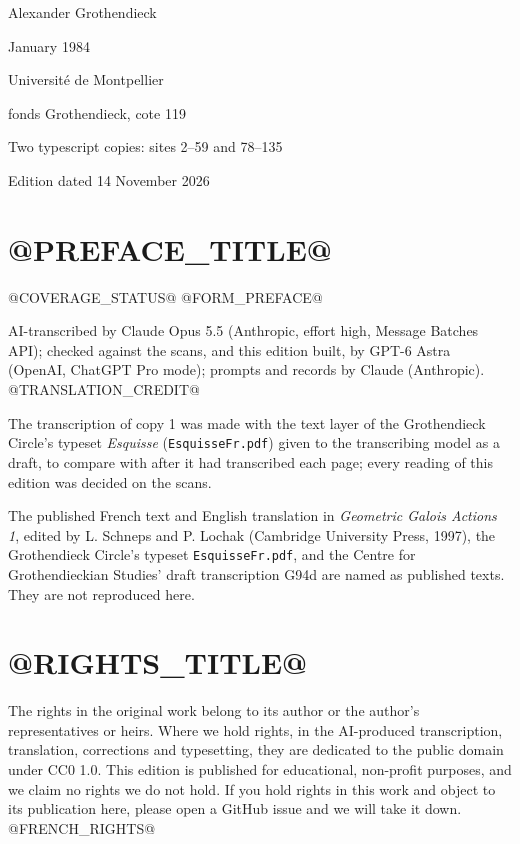 \hypersetup{pageanchor=false}
\begin{titlepage}
\centering
\vspace*{18mm}
{\Large Alexander Grothendieck\par}
\vspace{12mm}
{\Huge\bfseries\EditionTitle\par}
\vspace{8mm}
{\Large\EditionForm\par}
\vspace{14mm}
{\large January 1984\par}
\vfill
{\large Université de Montpellier\par fonds Grothendieck, cote 119\par}
\vspace{8mm}
{\normalsize Two typescript copies: sites 2--59 and 78--135\par}
\vspace{8mm}
{\normalsize Edition dated 14 November 2026\par}
\end{titlepage}
\hypersetup{pageanchor=true}
\thispagestyle{plain}
\section*{@PREFACE_TITLE@}
@COVERAGE_STATUS@
@FORM_PREFACE@

\smallskip
AI-transcribed by Claude Opus 5.5 (Anthropic, effort high, Message Batches API); checked against the scans, and this edition built, by GPT-6 Astra (OpenAI, ChatGPT Pro mode); prompts and records by Claude (Anthropic).
@TRANSLATION_CREDIT@

The transcription of copy 1 was made with the text layer of the Grothendieck Circle's typeset \textit{Esquisse} (\texttt{EsquisseFr.pdf}) given to the transcribing model as a draft, to compare with after it had transcribed each page; every reading of this edition was decided on the scans.

The published French text and English translation in \textit{Geometric Galois Actions 1}, edited by L. Schneps and P. Lochak (Cambridge University Press, 1997), the Grothendieck Circle's typeset \texttt{EsquisseFr.pdf}, and the Centre for Grothendieckian Studies' draft transcription G94d are named as published texts. They are not reproduced here.

\section*{@RIGHTS_TITLE@}
The rights in the original work belong to its author or the author's representatives or heirs. Where we hold rights, in the AI-produced transcription, translation, corrections and typesetting, they are dedicated to the public domain under CC0 1.0. This edition is published for educational, non-profit purposes, and we claim no rights we do not hold. If you hold rights in this work and object to its publication here, please open a GitHub issue and we will take it down.
@FRENCH_RIGHTS@
\clearpage

